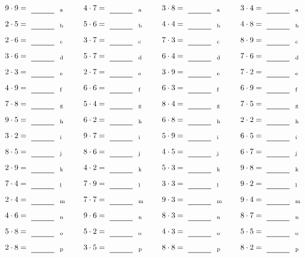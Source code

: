 \documentclass
[
  draft    = true,
  fontsize = 11pt,
  parskip  = half-
]
{scrartcl}
\begin{document}
\par\vfill\par
\begin{align*}
    \pline{9\cdot9}&=\rline{a}
  & \pline{4\cdot7}&=\rline{a}
  & \pline{3\cdot8}&=\rline{a}
  & \pline{3\cdot4}&=\rline{a} \\[1ex]
    \pline{2\cdot5}&=\rline{b}
  & \pline{5\cdot6}&=\rline{b}
  & \pline{4\cdot4}&=\rline{b}
  & \pline{4\cdot8}&=\rline{b} \\[1ex]
    \pline{2\cdot6}&=\rline{c}
  & \pline{3\cdot7}&=\rline{c}
  & \pline{7\cdot3}&=\rline{c}
  & \pline{8\cdot9}&=\rline{c} \\[1ex]
    \pline{3\cdot6}&=\rline{d}
  & \pline{5\cdot7}&=\rline{d}
  & \pline{6\cdot4}&=\rline{d}
  & \pline{7\cdot6}&=\rline{d} \\[1ex]
    \pline{2\cdot3}&=\rline{e}
  & \pline{2\cdot7}&=\rline{e}
  & \pline{3\cdot9}&=\rline{e}
  & \pline{7\cdot2}&=\rline{e} \\[1ex]
    \pline{4\cdot9}&=\rline{f}
  & \pline{6\cdot6}&=\rline{f}
  & \pline{6\cdot3}&=\rline{f}
  & \pline{6\cdot9}&=\rline{f} \\[1ex]
    \pline{7\cdot8}&=\rline{g}
  & \pline{5\cdot4}&=\rline{g}
  & \pline{8\cdot4}&=\rline{g}
  & \pline{7\cdot5}&=\rline{g} \\[1ex]
    \pline{9\cdot5}&=\rline{h}
  & \pline{6\cdot2}&=\rline{h}
  & \pline{6\cdot8}&=\rline{h}
  & \pline{2\cdot2}&=\rline{h} \\[1ex]
    \pline{3\cdot2}&=\rline{i}
  & \pline{9\cdot7}&=\rline{i}
  & \pline{5\cdot9}&=\rline{i}
  & \pline{6\cdot5}&=\rline{i} \\[1ex]
    \pline{8\cdot5}&=\rline{j}
  & \pline{8\cdot6}&=\rline{j}
  & \pline{4\cdot5}&=\rline{j}
  & \pline{6\cdot7}&=\rline{j} \\[1ex]
    \pline{2\cdot9}&=\rline{k}
  & \pline{4\cdot2}&=\rline{k}
  & \pline{5\cdot3}&=\rline{k}
  & \pline{9\cdot8}&=\rline{k} \\[1ex]
    \pline{7\cdot4}&=\rline{l}
  & \pline{7\cdot9}&=\rline{l}
  & \pline{3\cdot3}&=\rline{l}
  & \pline{9\cdot2}&=\rline{l} \\[1ex]
    \pline{2\cdot4}&=\rline{m}
  & \pline{7\cdot7}&=\rline{m}
  & \pline{9\cdot3}&=\rline{m}
  & \pline{9\cdot4}&=\rline{m} \\[1ex]
    \pline{4\cdot6}&=\rline{n}
  & \pline{9\cdot6}&=\rline{n}
  & \pline{8\cdot3}&=\rline{n}
  & \pline{8\cdot7}&=\rline{n} \\[1ex]
    \pline{5\cdot8}&=\rline{o}
  & \pline{5\cdot2}&=\rline{o}
  & \pline{4\cdot3}&=\rline{o}
  & \pline{5\cdot5}&=\rline{o} \\[1ex]
    \pline{2\cdot8}&=\rline{p}
  & \pline{3\cdot5}&=\rline{p}
  & \pline{8\cdot8}&=\rline{p}
  & \pline{8\cdot2}&=\rline{p}
\end{align*}
\end{document}
